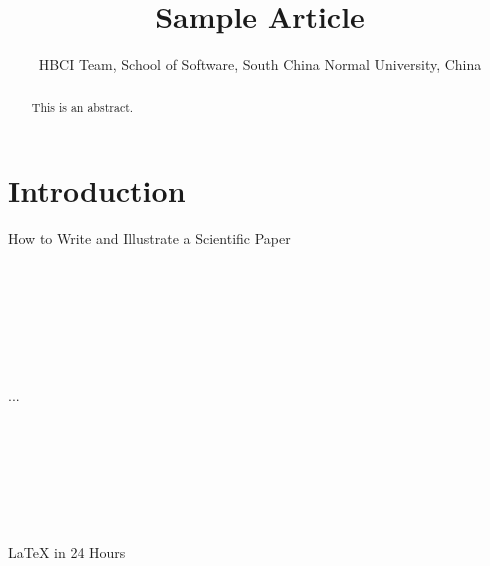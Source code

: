 \documentclass[]{article}
\title{Sample Article}
\author{HBCI Team,
School of Software, South China Normal University, China}
\begin{document}
\maketitle
\begin{abstract}This is an abstract.\end{abstract}
\section{Introduction}
How to Write and Illustrate a Scientific Paper
\cite{gustaviiHowWriteIllustrate2017a}
\\\\\\\\\\\\\\\\...\\\\\\\\\\\\\\\\
LaTeX in 24 Hours \cite{dattaLaTeX24Hours2017}


\end{document}
